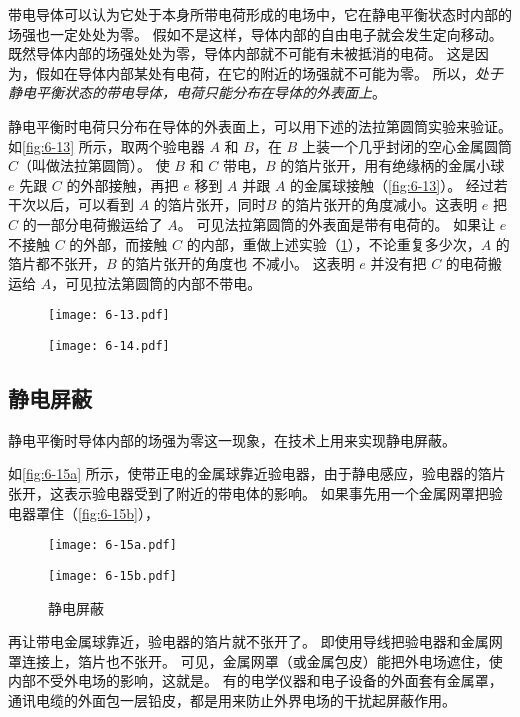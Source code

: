 带电导体可以认为它处于本身所带电荷形成的电场中，它在静电平衡状态时内部的场强也一定处处为零。
假如不是这样，导体内部的自由电子就会发生定向移动。
既然导体内部的场强处处为零，导体内部就不可能有未被抵消的电荷。
这是因为，假如在导体内部某处有电荷，在它的附近的场强就不可能为零。
所以，\emph{处于静电平衡状态的带电导体，电荷只能分布在导体的外表面上}。

静电平衡时电荷只分布在导体的外表面上，可以用下述的法拉第圆筒实验来验证。
如\cref{fig:6-13} 所示，取两个验电器 $A$ 和 $B$，在 $B$ 上装一个几乎封闭的空心金属圆筒 $C$（叫做法拉第圆筒）。
使 $B$ 和 $C$ 带电，$B$ 的箔片张开，用有绝缘柄的金属小球 $e$ 先跟 $C$ 的外部接触，再把 $e$ 移到 $A$ 并跟 $A$ 的金属球接触（\cref{fig:6-13}）。
经过若干次以后，可以看到 $A$ 的箔片张开，同时$B$ 的箔片张开的角度减小。这表明 $e$ 把 $C$ 的一部分电荷搬运给了 $A$。
可见法拉第圆筒的外表面是带有电荷的。
如果让 $e$ 不接触 $C$ 的外部，而接触 $C$ 的内部，重做上述实验（\cref{fig:6-14}），不论重复多少次，$A$ 的箔片都不张开，$B$ 的箔片张开的角度也
不减小。
这表明 $e$ 并没有把 $C$ 的电荷搬运给 $A$，可见拉法第圆筒的内部不带电。

\begin{figure}
	\begin{minipage}[b]{0.48\linewidth}\centering
		\texttt{[image: 6-13.pdf]}
		\caption{}\label{fig:6-13}
	\end{minipage}
	\begin{minipage}[b]{0.48\linewidth}\centering
		\texttt{[image: 6-14.pdf]}
		\caption{}\label{fig:6-14}
	\end{minipage}
\end{figure}

\subsection{静电屏蔽}
静电平衡时导体内部的场强为零这一现象，在技术上用来实现静电屏蔽。

如\cref{fig:6-15a} 所示，使带正电的金属球靠近验电器，由于静电感应，验电器的箔片张开，这表示验电器受到了附近的带电体的影响。
如果事先用一个金属网罩把验电器罩住（\cref{fig:6-15b}），
\begin{figure}
	\begin{minipage}[b]{0.48\linewidth}\centering
		\texttt{[image: 6-15a.pdf]}
		\subcaption{}\label{fig:6-15a}
	\end{minipage}
	\begin{minipage}[b]{0.48\linewidth}\centering
		\texttt{[image: 6-15b.pdf]}
		\subcaption{}\label{fig:6-15b}
	\end{minipage}
	\caption{静电屏蔽}\label{fig:6-15}
\end{figure}
再让带电金属球靠近，验电器的箔片就不张开了。
即使用导线把验电器和金属网罩连接上，箔片也不张开。
可见，金属网罩（或金属包皮）能把外电场遮住，使内部不受外电场的影响，这就是。
有的电学仪器和电子设备的外面套有金属罩，通讯电缆的外面包一层铅皮，都是用来防止外界电场的干扰起屏蔽作用。

